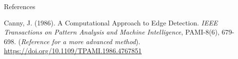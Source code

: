 \documentclass[final]{beamer}
\newlength{\sepwidth}
\newlength{\colwidth}
\newcommand{\separatorcolumn}{\begin{column}{\sepwidth}\end{column}}
\begin{document}
\begin{frame}[t]
\begin{columns}[t]
\begin{column}{\colwidth}
\begin{block}{References}
\begin{thebibliography}{9}
        Canny, J. (1986). A Computational Approach to Edge Detection. \textit{IEEE Transactions on Pattern Analysis and Machine Intelligence}, PAMI-8(6), 679-698.
        \newblock (\textit{Reference for a more advanced method}). \url{https://doi.org/10.1109/TPAMI.1986.4767851}

    \end{thebibliography}
  \end{block}

\end{column} %

\separatorcolumn %

\end{columns} %
\end{frame} %
\end{document}
